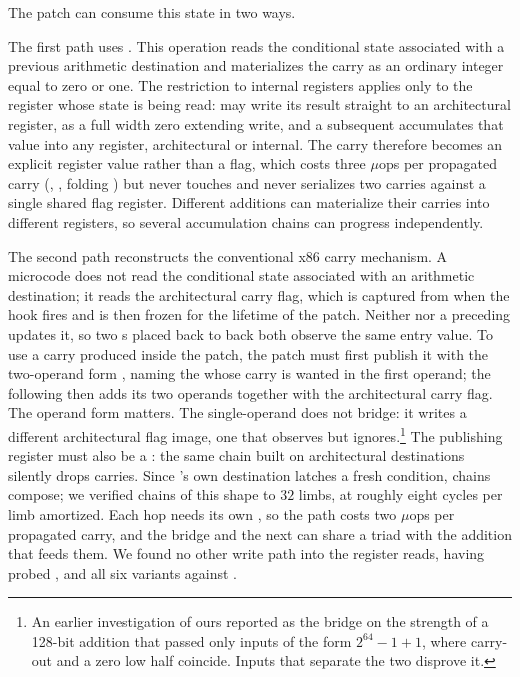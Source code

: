 The patch can consume this state in two ways.

The first path uses .
This operation reads the conditional state associated with a previous
arithmetic destination and materializes the carry as an ordinary integer equal
to zero or one.
The restriction to internal registers applies only to the register whose state
is being read:  may write its result straight to an
architectural register, as a full width zero extending write, and a subsequent
 accumulates that value into any register, architectural or
internal.
The carry therefore becomes an explicit register value rather than a flag,
which costs three $\mu$ops per propagated carry
(, , folding )
but never touches  and never serializes two carries against a
single shared flag register.
Different additions can materialize their carries into different registers, so
several accumulation chains can progress independently.

The second path reconstructs the conventional x86 carry mechanism.
A microcode  does not read the conditional state associated with an
arithmetic destination; it reads the architectural carry flag, which is
captured from  when the hook fires and is then frozen for the
lifetime of the patch.
Neither  nor a preceding  updates it, so two s
placed back to back both observe the same entry value.
To use a carry produced inside the patch, the patch must first publish it with
the two-operand form , naming the  whose
carry is wanted in the first operand; the following  then adds its
two operands together with the architectural carry flag.
The operand form matters.
The single-operand  does not bridge: it writes a
different architectural flag image, one that  observes but
 ignores.\footnote{An earlier investigation of ours reported
 as the bridge on the strength of a 128-bit addition
that passed only inputs of the form $2^{64}-1+1$, where carry-out and a zero
low half coincide. Inputs that separate the two disprove it.}
The publishing register must also be a : the same chain built on
architectural destinations silently drops carries.
Since 's own destination latches a fresh condition, chains compose;
we verified chains of this shape to $32$ limbs, at roughly eight cycles per
limb amortized.
Each hop needs its own , so the path costs two $\mu$ops
per propagated carry, and the bridge and the next  can share a triad
with the addition that feeds them.
We found no other write path into the register  reads, having probed
,  and all six 
variants against .

